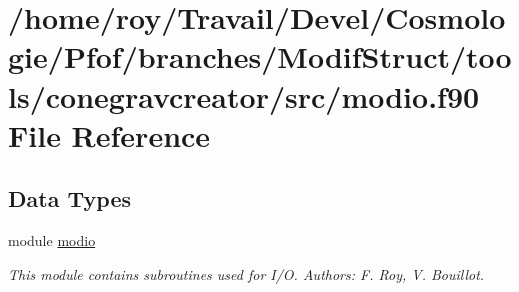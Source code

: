 \hypertarget{tools_2conegravcreator_2src_2modio_8f90}{\section{/home/roy/\-Travail/\-Devel/\-Cosmologie/\-Pfof/branches/\-Modif\-Struct/tools/conegravcreator/src/modio.f90 File Reference}
\label{tools_2conegravcreator_2src_2modio_8f90}
}
\subsection*{Data Types}
\begin{DoxyCompactItemize}
\item 
module \hyperlink{classmodio}{modio}
\begin{DoxyCompactList}\small\item\em This module contains subroutines used for I/\-O. Authors\-: F. Roy, V. Bouillot. \end{DoxyCompactList}\end{DoxyCompactItemize}
